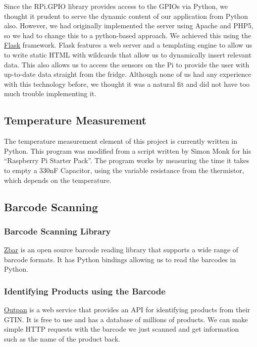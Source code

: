 \documentclass[10pt]{article}
\begin{document}
Since the RPi.GPIO library provides access to the GPIOs via Python, we thought it prudent to serve the dynamic content of our application from Python also. However, we had originally implemented the server using Apache and PHP5, so we had to change this to a python-based approach. We achieved this using the \hyperref[http://flask.pocoo.org/]{Flask} framework. Flask features a web server and a templating engine to allow us to write static HTML with wildcards that allow us to dynamically insert relevant data. This also allows us to access the sensors on the Pi to provide the user with up-to-date data straight from the fridge. Although none of us had any experience with this technology before, we thought it was a natural fit and did not have too much trouble implementing it.

\subsection{Temperature Measurement}

The temperature measurement element of this project is currently written in Python. This program was modified from a script written by Simon Monk for his ``Raspberry Pi Starter Pack''. The program works by measuring the time it takes to empty a 330nF Capacitor, using the variable resistance from the thermistor, which depends on the temperature. 

\subsection{Barcode Scanning}
\subsubsection{Barcode Scanning Library}

\hyperref[http://zbar.sourceforge.net/]{Zbar} is an open source barcode reading library that supports a wide range of barcode formats. It has Python bindings allowing us to read the barcodes in Python.

\subsubsection{Identifying Products using the Barcode}

\hyperref[https://www.outpan.com/]{Outpan} is a web service that provides an API for identifying products from their GTIN. It is free to use and has a database of millions of products. We can make simple HTTP requests with the barcode we just scanned and get information such as the name of the product back.
\end{document}

